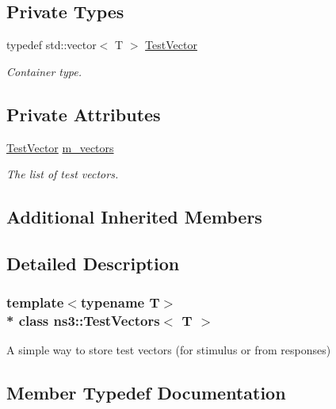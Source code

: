 \subsection*{Private Types}
\begin{DoxyCompactItemize}
\item 
typedef std\+::vector$<$ T $>$ \hyperlink{classns3_1_1TestVectors_a10d8394b57d0d5e2d9620cc0b745d642}{Test\+Vector}
\begin{DoxyCompactList}\small\item\em Container type. \end{DoxyCompactList}\end{DoxyCompactItemize}
\subsection*{Private Attributes}
\begin{DoxyCompactItemize}
\item 
\hyperlink{classns3_1_1TestVectors_a10d8394b57d0d5e2d9620cc0b745d642}{Test\+Vector} \hyperlink{classns3_1_1TestVectors_ae759d23772eb633cda0c3c33287fb42a}{m\+\_\+vectors}
\begin{DoxyCompactList}\small\item\em The list of test vectors. \end{DoxyCompactList}\end{DoxyCompactItemize}
\subsection*{Additional Inherited Members}


\subsection{Detailed Description}
\subsubsection*{template$<$typename T$>$\\*
class ns3\+::\+Test\+Vectors$<$ T $>$}

A simple way to store test vectors (for stimulus or from responses) 

\subsection{Member Typedef Documentation}

